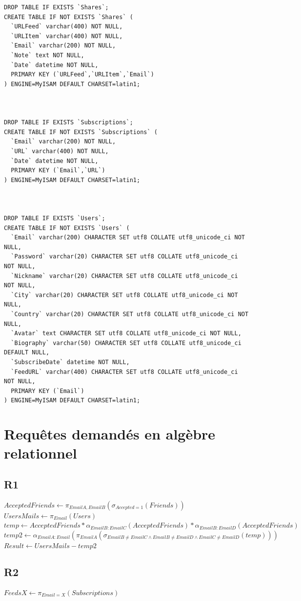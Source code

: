 \documentclass[11pt]{article}
\begin{document}
\begin{verbatim}
DROP TABLE IF EXISTS `Shares`;
CREATE TABLE IF NOT EXISTS `Shares` (
  `URLFeed` varchar(400) NOT NULL,
  `URLItem` varchar(400) NOT NULL,
  `Email` varchar(200) NOT NULL,
  `Note` text NOT NULL,
  `Date` datetime NOT NULL,
  PRIMARY KEY (`URLFeed`,`URLItem`,`Email`)
) ENGINE=MyISAM DEFAULT CHARSET=latin1;



DROP TABLE IF EXISTS `Subscriptions`;
CREATE TABLE IF NOT EXISTS `Subscriptions` (
  `Email` varchar(200) NOT NULL,
  `URL` varchar(400) NOT NULL,
  `Date` datetime NOT NULL,
  PRIMARY KEY (`Email`,`URL`)
) ENGINE=MyISAM DEFAULT CHARSET=latin1;



DROP TABLE IF EXISTS `Users`;
CREATE TABLE IF NOT EXISTS `Users` (
  `Email` varchar(200) CHARACTER SET utf8 COLLATE utf8_unicode_ci NOT NULL,
  `Password` varchar(20) CHARACTER SET utf8 COLLATE utf8_unicode_ci NOT NULL,
  `Nickname` varchar(20) CHARACTER SET utf8 COLLATE utf8_unicode_ci NOT NULL,
  `City` varchar(20) CHARACTER SET utf8 COLLATE utf8_unicode_ci NOT NULL,
  `Country` varchar(20) CHARACTER SET utf8 COLLATE utf8_unicode_ci NOT NULL,
  `Avatar` text CHARACTER SET utf8 COLLATE utf8_unicode_ci NOT NULL,
  `Biography` varchar(50) CHARACTER SET utf8 COLLATE utf8_unicode_ci DEFAULT NULL,
  `SubscribeDate` datetime NOT NULL,
  `FeedURL` varchar(400) CHARACTER SET utf8 COLLATE utf8_unicode_ci NOT NULL,
  PRIMARY KEY (`Email`)
) ENGINE=MyISAM DEFAULT CHARSET=latin1;
\end{verbatim}
\section{Requêtes demandés en algèbre relationnel}
\subsection{R1}
\noindent $AcceptedFriends \longleftarrow \pi_{EmailA, EmailB}(\sigma_{Accepted = 1}(Friends))$ \\
$UsersMails \longleftarrow \pi_{Email}(Users)$ \\
$temp \longleftarrow AcceptedFriends \ast \alpha_{EmailB : EmailC}(AcceptedFriends) \ast \alpha_{EmailB : EmailD}(AcceptedFriends) $ \\
$temp2 \longleftarrow \alpha_{EmailA : Email}(\pi_{EmailA}(\sigma_{EmailB \neq EmailC \wedge EmailB \neq EmailD \wedge EmailC \neq EmailD}(temp))) $ \\
$Result \longleftarrow UsersMails - temp2 $
\subsection{R2}
\noindent $FeedsX \longleftarrow \pi_{Email = X}(Subscriptions) $ \\
\end{document}
